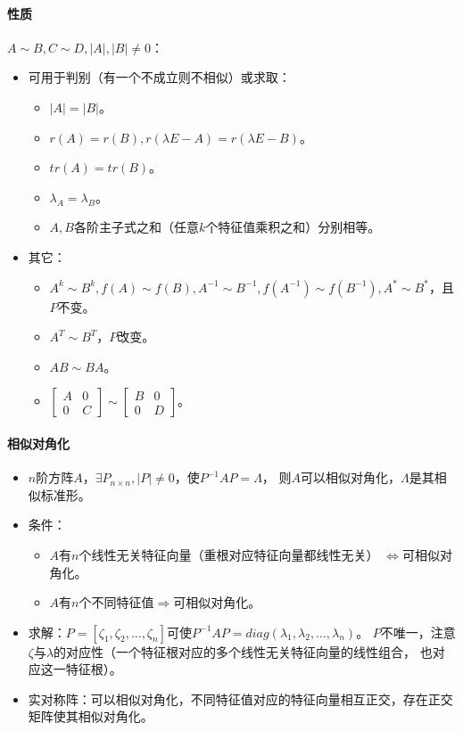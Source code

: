 \documentclass[
12pt, %
a4paper, 
oneside, %
headinclude,footinclude, %
]{scrartcl}
\begin{document}
\paragraph{性质}
$ A \sim B, C \sim D, |A|,|B| \neq 0 $：
\begin{itemize}
\item 可用于判别（有一个不成立则不相似）或求取：
\begin{itemize}
\item $ |A| = |B| $。
\item $ r(A) = r(B), r(\lambda E - A) = r(\lambda E - B) $。
\item $ tr(A) = tr(B) $。
\item $ \lambda_A = \lambda_B $。
\item $ A,B $各阶主子式之和（任意$ k $个特征值乘积之和）分别相等。
\end{itemize}
\item 其它：
\begin{itemize}
\item $ A^k \sim B^k, f(A) \sim f(B), A^{-1} \sim B^{-1}, f(A^{-1}) \sim f(B^{-1}), A^* \sim B^* $，且$ P $不变。
\item $ A^T \sim B^T $，$ P $改变。
\item $ AB \sim BA $。
\item $ \begin{bmatrix} A & 0 \\ 0 & C \end{bmatrix} \sim \begin{bmatrix} B & 0 \\ 0 & D \end{bmatrix} $。
\end{itemize} 
\end{itemize}
\paragraph{相似对角化}
\begin{itemize}
\item $ n $阶方阵$ A $，$ \exists P_{n \times n}, |P| \neq 0 $，使$ P^{-1}AP = \varLambda $，
则$ A $可以相似对角化，$ \varLambda $是其相似标准形。
\item 条件：
\begin{itemize}
\item $ A $有$ n $个线性无关特征向量（重根对应特征向量都线性无关）
$ \Leftrightarrow $可相似对角化。
\item $ A $有$ n $个不同特征值$ \Rightarrow $可相似对角化。
\end{itemize} 
\item 求解：$ P = [\zeta_1, \zeta_2, \dots, \zeta_n] $可使$ P^{-1}AP = diag(\lambda_1, \lambda_2, \dots ,\lambda_n) $。
$ P $不唯一，注意$ \zeta $与$ \lambda $的对应性（一个特征根对应的多个线性无关特征向量的线性组合，
也对应这一特征根）。
\item 实对称阵：可以相似对角化，不同特征值对应的特征向量相互正交，存在正交矩阵使其相似对角化。
\end{itemize} 
\end{document}
